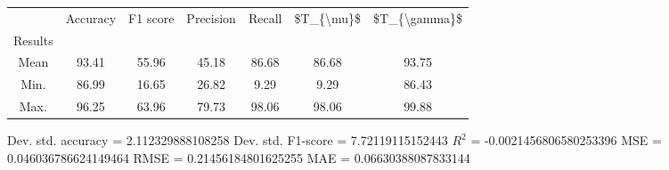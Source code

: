 \begin{tabular}{|c|c|c|c|c|c|c|}
\toprule
{} &  Accuracy &  F1 score &  Precision &  Recall &  \$T\_\{\textbackslash mu\}\$ &  \$T\_\{\textbackslash gamma\}\$ \\
Results &           &           &            &         &            &               \\
\hline
Mean    &     93.41 &     55.96 &      45.18 &   86.68 &      86.68 &         93.75 \\
Min.    &     86.99 &     16.65 &      26.82 &    9.29 &       9.29 &         86.43 \\
Max.    &     96.25 &     63.96 &      79.73 &   98.06 &      98.06 &         99.88 \\
\bottomrule
\end{tabular}

 Dev. std. accuracy = 2.112329888108258
 Dev. std. F1-score = 7.72119115152443
 $R^2$ = -0.0021456806580253396
 MSE = 0.046036786624149464
 RMSE = 0.21456184801625255
 MAE = 0.06630388087833144